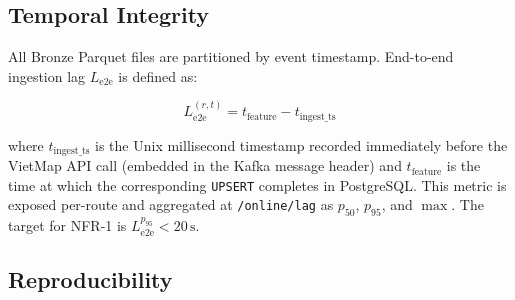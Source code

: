   \subsection{Temporal Integrity}
  \label{subsec:eval_temporal}

  All Bronze Parquet files are partitioned by event timestamp.                                                                                            
  End-to-end ingestion lag $L_{\text{e2e}}$ is defined as:
                                                                                                                                                          
  \begin{equation}
  \label{eq:lag}                                                                                                                                          
  L_{\text{e2e}}^{(r,t)} = t_{\text{feature}} - t_{\text{ingest\_ts}}
  \end{equation}                                                                                                                                          
   
  where $t_{\text{ingest\_ts}}$ is the Unix millisecond timestamp                                                                                         
  recorded immediately before the VietMap API call (embedded in the
  Kafka message header) and $t_{\text{feature}}$ is the time at which                                                                                     
  the corresponding \texttt{UPSERT} completes in PostgreSQL. This metric
  is exposed per-route and aggregated at \texttt{/online/lag} as                                                                                          
  $p_{50}$, $p_{95}$, and $\max$. The target for NFR-1 is                                                                                                 
  $L_{\text{e2e}}^{p_{95}} < 20\,\text{s}$.                                                                                                               
                                                                                                                                                          
  \subsection{Reproducibility}                                                                                                                            
  \label{subsec:eval_reproducibility}

